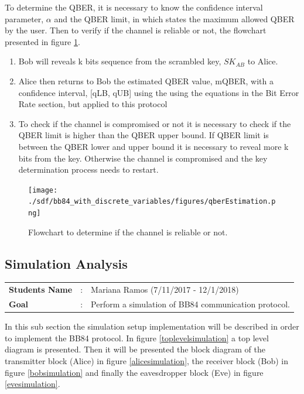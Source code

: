 	To determine the QBER, it is necessary to know the confidence interval parameter, $\alpha$ and the QBER limit, in which states the maximum allowed QBER by the user.
	Then to verify if the channel is reliable or not, the flowchart presented in figure \ref{fig:flowQber}.
	
	\begin{enumerate}
		\item Bob will reveals k bits sequence from the scrambled key, $SK_{AB}$ to Alice.
		\item Alice then returns to Bob the estimated QBER value, mQBER, with a confidence interval, [qLB, qUB] using the using the equations in the Bit Error Rate section, but applied to this protocol
		\item To check if the channel is compromised or not it is necessary to check if the QBER limit is higher than the QBER upper bound. If QBER limit is between the QBER lower and upper bound it is necessary to reveal more k bits from the key. Otherwise the channel is compromised and the key determination process needs to restart.
	\end{enumerate}
	
	
\begin{figure}[H]
	\centering
	\texttt{[image: ./sdf/bb84\_with\_discrete\_variables/figures/qberEstimation.png]}
	\caption{Flowchart to determine if the channel is reliable or not.}\label{fig:flowQber}
\end{figure}



\newpage

\subsection{Simulation Analysis}

\begin{tcolorbox}	
\begin{tabular}{p{2.75cm} p{0.2cm} p{10.5cm}} 	
\textbf{Students Name}  &:& Mariana Ramos (7/11/2017 - 12/1/2018) \\
\textbf{Goal}          &:& Perform a simulation of BB84 communication protocol.
\end{tabular}
\end{tcolorbox}

In this sub section the simulation setup implementation will be described in order to implement the BB84 protocol. In figure \ref{toplevelsimulation} a top level diagram is presented. Then it will be presented the block diagram of the transmitter block (Alice) in figure \ref{alicesimulation}, the receiver block (Bob) in figure \ref{bobsimulation} and finally the eavesdropper block (Eve) in figure \ref{evesimulation}.


